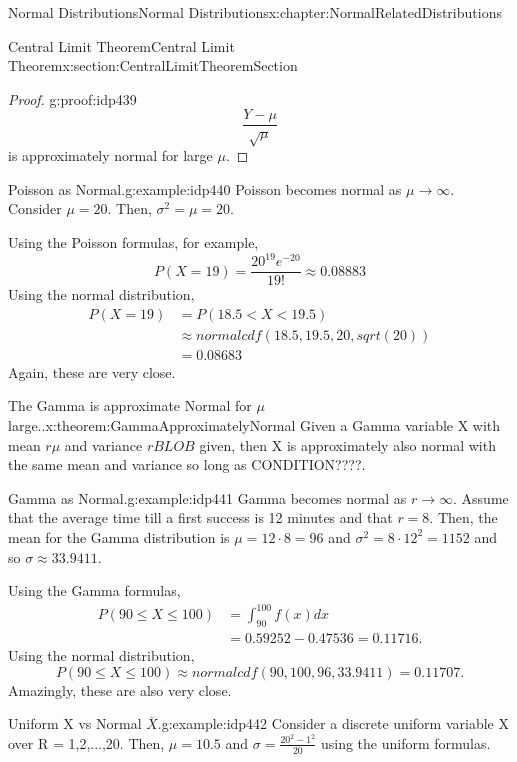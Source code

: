 \documentclass[oneside,10pt,]{book}
\numberwithin{equation}{section}
\newcommand{\lt}{<}
\begin{document}
\begin{chapterptx}{Normal Distributions}{}{Normal Distributions}{}{}{x:chapter:NormalRelatedDistributions}
\begin{sectionptx}{Central Limit Theorem}{}{Central Limit Theorem}{}{}{x:section:CentralLimitTheoremSection}
\begin{proof}{}{g:proof:idp439}
\begin{equation*}
\frac{Y - \mu}{\sqrt{\mu}}
\end{equation*}
is approximately normal for large \(\mu\).%
\end{proof}
\begin{example}{Poisson as Normal.}{g:example:idp440}%
Poisson becomes normal as \(\mu \rightarrow \infty\).  Consider \(\mu = 20\).  Then, \(\sigma^2 = \mu = 20\).%
\par
Using the Poisson formulas, for example,%
\begin{equation*}
P( X = 19 ) = \frac{20^{19} e^{-20}}{19!} \approx 0.08883
\end{equation*}
Using the normal distribution,%
\begin{align*}
P( X = 19 ) & = P( 18.5 \lt X \lt 19.5) \\
& \approx normalcdf(18.5,19.5,20,sqrt(20)) \\
& = 0.08683
\end{align*}
Again, these are very close.%
\end{example}
\begin{theorem}{The Gamma is approximate Normal for \(\mu\) large..}{}{x:theorem:GammaApproximatelyNormal}%
Given a Gamma variable X with mean \(r \mu\) and variance \(r BLOB\) given, then X is approximately also normal with the same mean and variance so long as CONDITION????.%
\end{theorem}
\begin{example}{Gamma as Normal.}{g:example:idp441}%
Gamma becomes normal as \(r \rightarrow \infty\).  Assume that the average time till a first success is 12 minutes and that \(r = 8\).  Then, the mean for the Gamma distribution is \(\mu = 12 \cdot 8 = 96\) and \(\sigma^2 = 8 \cdot 12^2 = 1152\) and so \(\sigma \approx 33.9411\).%
\par
Using the Gamma formulas,%
\begin{align*}
P( 90 \le X \le 100 ) & = \int_{90}^{100} f(x) dx \\
& = 0.59252 - 0.47536 = 0.11716.
\end{align*}
Using the normal distribution,%
\begin{equation*}
P( 90 \le X \le 100) \approx normalcdf(90,100,96,33.9411) = 0.11707.
\end{equation*}
Amazingly, these are also very close.%
\end{example}
\begin{example}{Uniform X vs Normal \(\overline{X}\).}{g:example:idp442}%
Consider a discrete uniform variable X over R = \textbraceleft{}1,2,...,20\textbraceright{}.  Then, \(\mu = 10.5\) and \(\sigma = \frac{20^2-1^2}{20}\) using the uniform formulas.%

\end{example}
\end{sectionptx}
\end{chapterptx}
\end{document}
